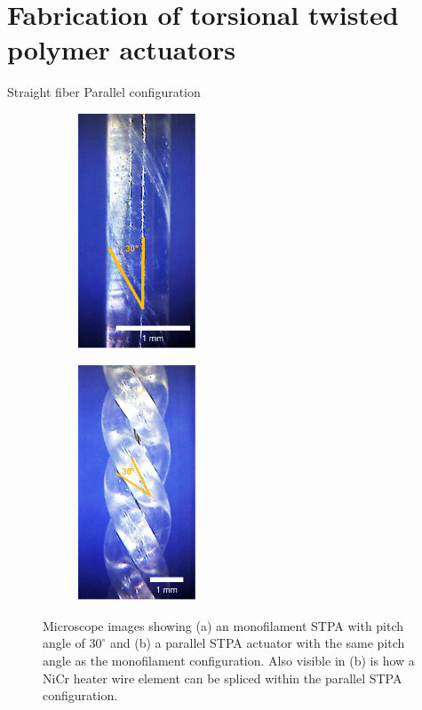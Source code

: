 \documentclass[twocolumn,10pt]{asme2e}
\begin{document}
\section{Fabrication of torsional twisted polymer actuators}
Straight fiber
Parallel configuration


\begin{figure}
    \centering
     \begin{subfigure}[b]{0.15\textwidth}
        \includegraphics[width=3.5cm]{../Images/micro_mono.pdf}
        \caption{}
        \label{fig:miro_mono}
        \end{subfigure}
        \quad \quad  \quad \quad
     \begin{subfigure}[b]{0.15\textwidth}
        \includegraphics[width=3.5cm]{../Images/micro_para.pdf}
        \caption{}
        \label{fig:micro_para}
        \end{subfigure}
        \caption{Microscope images showing (a) an monofilament STPA with pitch angle of $30^\circ$ and (b) a parallel STPA actuator with the same pitch angle as the monofilament configuration. Also visible in (b) is how a NiCr heater wire element can be spliced within the parallel STPA configuration.  }
        \label{fig:micro}
\end{figure}
\end{document}

